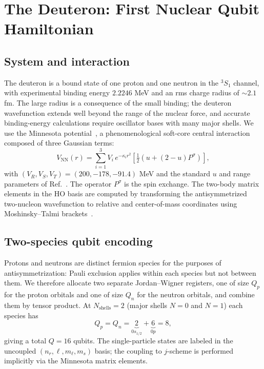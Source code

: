 \documentclass[twocolumn,prc,amsmath,amssymb,superscriptaddress]{revtex4-2}
\begin{document}
\section{The Deuteron: First Nuclear Qubit Hamiltonian}
\label{sec:deuteron}

\subsection{System and interaction}

The deuteron is a bound state of one proton and one neutron in the
$^3S_1$ channel, with experimental binding energy $2.2246$ MeV and an
rms charge radius of $\sim 2.1$ fm. The large radius is a consequence
of the small binding; the deuteron wavefunction extends well beyond
the range of the nuclear force, and accurate binding-energy
calculations require oscillator bases with many major shells. We use
the Minnesota potential~\cite{Thompson1977}, a phenomenological
soft-core central interaction composed of three Gaussian terms:
\begin{equation}
  V_{\mathrm{NN}}(r) = \sum_{i=1}^{3} V_i \, e^{-\kappa_i r^2}
  \left[\tfrac{1}{2}(u + (2 - u) P^\sigma)\right],
\label{eq:minnesota}
\end{equation}
with $(V_R, V_S, V_T) = (200, -178, -91.4)$ MeV and the standard
$u$ and range parameters of Ref.~\cite{Thompson1977}. The operator
$P^\sigma$ is the spin exchange. The two-body matrix elements in the
HO basis are computed by transforming the antisymmetrized
two-nucleon wavefunction to relative and center-of-mass coordinates
using Moshinsky--Talmi brackets~\cite{Moshinsky1959,Talmi1952}.

\subsection{Two-species qubit encoding}

Protons and neutrons are distinct fermion species for the purposes of
antisymmetrization: Pauli exclusion applies within each species but
not between them. We therefore allocate two separate Jordan--Wigner
registers, one of size $Q_p$ for the proton orbitals and one of size
$Q_n$ for the neutron orbitals, and combine them by tensor product.
At $N_{\mathrm{shells}} = 2$ (major shells $N=0$ and $N=1$) each
species has
\[
  Q_p = Q_n =
  \underbrace{2}_{0s_{1/2}} + \underbrace{6}_{0p} = 8,
\]
giving a total $Q = 16$ qubits. The single-particle states are labeled
in the uncoupled $(n_r, \ell, m_\ell, m_s)$ basis; the coupling to
$j$-scheme is performed implicitly via the Minnesota matrix elements.
\end{document}
